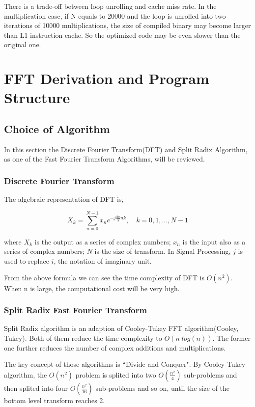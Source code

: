 \documentclass[a4paper]{report}
\begin{document}
	There is a trade-off between loop unrolling and cache miss rate. In the multiplication case, if N equals to 20000 and the loop is unrolled into two iterations of 10000 multiplications, the size of compiled binary may become larger than L1 instruction cache. So the optimized code may be even slower than the original one.

\chapter{FFT Derivation and Program Structure}

\section{Choice of Algorithm} \indent

	In this section the Discrete Fourier Transform(DFT) and Split Radix Algorithm, as one of the Fast Fourier Transform Algorithms, will be reviewed.

\subsection{Discrete Fourier Transform} \indent

	The algebraic representation of DFT is,
	
	\[X_k = \sum^{N-1}_{n=0} x_n e^{-j\frac{2\pi}{N}nk}, \quad k = 0, 1, ..., N-1\]
	
	where $X_k$ is the output as a series of complex numbers; $x_n$ is the input also as a series of complex numbers; $N$ is the size of transform. In Signal Processing, $j$ is used to replace $i$, the notation of imaginary unit.
	
	From the above formula we can see the time complexity of DFT is $O(n^2)$. When n is large, the computational cost will be very high.

\subsection{Split Radix Fast Fourier Transform} \indent

	Split Radix algorithm is an adaption of Cooley-Tukey FFT algorithm(Cooley, Tukey). Both of them reduce the time complexity to $O(n\;log(n))$. The former one further reduces the number of complex additions and multiplications.
	
	The key concept of those algorithms is ``Divide and Conquer". By Cooley-Tukey algorithm, the $O(n^2)$ problem is splited into two $O(\frac{n^2}{4})$ sub-problems and then splited into four $O(\frac{n^2}{16})$ sub-problems and so on, until the size of the bottom level transform reaches 2.
\end{document}
